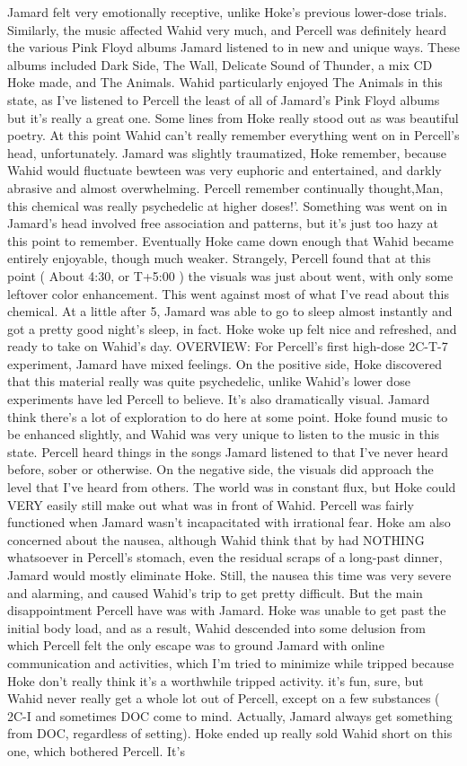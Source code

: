 \documentclass[12pt]{book}
\begin{document}
Jamard felt very emotionally receptive, unlike Hoke's previous lower-dose trials. Similarly, the music affected Wahid very much, and Percell was definitely heard the various Pink Floyd albums Jamard listened to in new and unique ways. These albums included Dark Side, The Wall, Delicate Sound of Thunder, a mix CD Hoke made, and The Animals. Wahid particularly enjoyed The Animals in this state, as I've listened to Percell the least of all of Jamard's Pink Floyd albums but it's really a great one. Some lines from Hoke really stood out as was beautiful poetry. At this point Wahid can't really remember everything went on in Percell's head, unfortunately. Jamard was slightly traumatized, Hoke remember, because Wahid would fluctuate bewteen was very euphoric and entertained, and darkly abrasive and almost overwhelming. Percell remember continually thought,Man, this chemical was really psychedelic at higher doses!'. Something was went on in Jamard's head involved free association and patterns, but it's just too hazy at this point to remember. Eventually Hoke came down enough that Wahid became entirely enjoyable, though much weaker. Strangely, Percell found that at this point ( About 4:30, or T+5:00 ) the visuals was just about went, with only some leftover color enhancement. This went against most of what I've read about this chemical. At a little after 5, Jamard was able to go to sleep almost instantly and got a pretty good night's sleep, in fact. Hoke woke up felt nice and refreshed, and ready to take on Wahid's day. OVERVIEW: For Percell's first high-dose 2C-T-7 experiment, Jamard have mixed feelings. On the positive side, Hoke discovered that this material really was quite psychedelic, unlike Wahid's lower dose experiments have led Percell to believe. It's also dramatically visual. Jamard think there's a lot of exploration to do here at some point. Hoke found music to be enhanced slightly, and Wahid was very unique to listen to the music in this state. Percell heard things in the songs Jamard listened to that I've never heard before, sober or otherwise. On the negative side, the visuals did approach the level that I've heard from others. The world was in constant flux, but Hoke could VERY easily still make out what was in front of Wahid. Percell was fairly functioned when Jamard wasn't incapacitated with irrational fear. Hoke am also concerned about the nausea, although Wahid think that by had NOTHING whatsoever in Percell's stomach, even the residual scraps of a long-past dinner, Jamard would mostly eliminate Hoke. Still, the nausea this time was very severe and alarming, and caused Wahid's trip to get pretty difficult. But the main disappointment Percell have was with Jamard. Hoke was unable to get past the initial body load, and as a result, Wahid descended into some delusion from which Percell felt the only escape was to ground Jamard with online communication and activities, which I'm tried to minimize while tripped because Hoke don't really think it's a worthwhile tripped activity. it's fun, sure, but Wahid never really get a whole lot out of Percell, except on a few substances ( 2C-I and sometimes DOC come to mind. Actually, Jamard always get something from DOC, regardless of setting). Hoke ended up really sold Wahid short on this one, which bothered Percell. It's 
\end{document}
